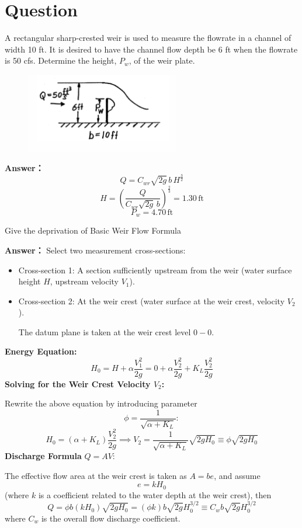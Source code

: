 \documentclass[12pt,a4paper]{article}
\newcounter{question}
\newenvironment{questions}{
    \setcounter{question}{0}
    \section*{Question}
    \begin{enumerate}[leftmargin=1.5em,label={\arabic*．}]
}{
    \end{enumerate}
}
\newcommand{\answer}[1]{\par\noindent\textbf{Answer：} #1\par\vspace{1em}}
\begin{document}
\begin{questions}
{\item A rectangular sharp-crested weir is used to measure the flowrate in a channel of width 10 ft. It is desired to have the channel flow depth be 6 ft when the flowrate is 50 cfs. Determine the height, \( P_w \), of the weir plate.

\begin{figure}[H]
\centering
\includegraphics[width=0.6\textwidth]{./figures/32.png}
\end{figure}

\answer{
  \[
Q = C_{wr} \sqrt{2g} \, b \, H^{\frac{3}{2}}
\]
\[
H = \left( \frac{Q}{C_{wr} \sqrt{2g} \, b} \right)^{\frac{2}{3}} = 1.30 \, \text{ft}
\]
\[
P_w = 4.70 \, \text{ft}
\]
}

\item Give the deprivation of  Basic Weir Flow Formula

\answer{
Select two measurement cross-sections:

\begin{itemize}
  \item Cross-section 1: A section sufficiently upstream from the weir (water surface height \( H \), upstream velocity \( V_1 \)).
  \item Cross-section 2: At the weir crest (water surface at the weir crest, velocity \( V_2 \)).
  
  The datum plane is taken at the weir crest level \( 0-0 \).
\end{itemize}

\textbf{Energy Equation:}
\[
H_0 = H + \alpha \frac{V_1^2}{2g} = 0 + \alpha \frac{V_2^2}{2g} + K_L \frac{V_2^2}{2g}
\]
\textbf{Solving for the Weir Crest Velocity \( V_2 \):}

Rewrite the above equation by introducing parameter
\[
\phi = \frac{1}{\sqrt{\alpha + K_L}}:
\]
\[
H_0 = (\alpha + K_L) \frac{V_2^2}{2g} \implies V_2 = \frac{1}{\sqrt{\alpha + K_L}} \sqrt{2gH_0} \equiv \phi \sqrt{2gH_0}
\]
\textbf{Discharge Formula} \( Q = A V \):

The effective flow area at the weir crest is taken as \( A = b e \), and assume
\[
e = k H_0
\]
(where \( k \) is a coefficient related to the water depth at the weir crest), then
\[
Q = \phi b (k H_0) \sqrt{2gH_0} = (\phi k) b \sqrt{2g} H_0^{3/2} \equiv C_w b \sqrt{2g} H_0^{3/2}
\]
where \( C_w \) is the overall flow discharge coefficient.

}}
\end{questions}
\end{document}
